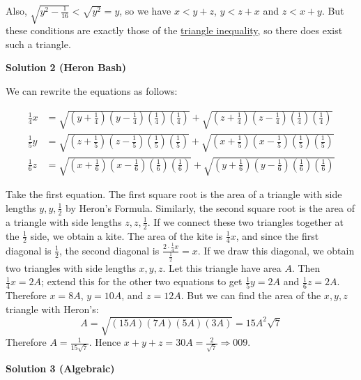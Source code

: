 \begin{enumerate}
 Also, $\sqrt{y^2-\frac{1}{16}} < \sqrt{y^2} = y$, so we have $x < y + z$, $y < z + x$ and $z < x + y$.  But these conditions are exactly those of the \href{https://artofproblemsolving.com/wiki/index.php?title=Triangle\_inequality}{triangle inequality}, so there does exist such a triangle.

 



\textbf{Solution 2 (Heron Bash)}

We can rewrite the equations as follows:

 
 \begin{align*} \frac{1}{4}x &= \sqrt{\left(y+\frac{1}{4}\right) \left(y-\frac{1}{4}\right)\left(\frac{1}{4}\right) \left(\frac{1}{4}\right)}+\sqrt{\left(z+\frac{1}{4}\right) \left(z-\frac{1}{4}\right) \left(\frac{1}{4}\right) \left(\frac{1}{4}\right)} \\ \frac{1}{5} y &= \sqrt{\left(z+\frac{1}{5}\right) \left(z-\frac{1}{5}\right) \left(\frac{1}{5}\right) \left(\frac{1}{5}\right)}+\sqrt{\left(x+\frac{1}{5}\right) \left(x-\frac{1}{5}\right) \left(\frac{1}{5}\right) \left(\frac{1}{5}\right)} \\ \frac{1}{6} z &= \sqrt{\left(x+\frac{1}{6}\right) \left(x-\frac{1}{6}\right) \left(\frac{1}{6}\right) \left(\frac{1}{6}\right)}+\sqrt{\left(y+\frac{1}{6}\right) \left(y-\frac{1}{6}\right) \left(\frac{1}{6}\right) \left(\frac{1}{6}\right)} \end{align*}


 Take the first equation. The first square root is the area of a triangle with side lengths $y,y,\frac{1}{2}$ by Heron’s Formula. Similarly, the second square root is the area of a triangle with side lengths $z,z,\frac{1}{2}$. If we connect these two triangles together at the $\frac{1}{2}$ side, we obtain a kite. The area of the kite is $\frac{1}{4}x$, and since the first diagonal is $\frac{1}{2}$, the second diagonal is $\frac{2\cdot\frac{1}{4}x}{\frac{1}{2}}=x$. If we draw this diagonal, we obtain two triangles with side lengths $x,y,z$. Let this triangle have area $A$. Then $\frac{1}{4}x=2A$; extend this for the other two equations to get $\frac{1}{5}y=2A$ and $\frac{1}{6}z=2A$. Therefore $x=8A$, $y=10A$, and $z=12A$. But we can find the area of the $x,y,z$ triangle with Heron's:
 \[A=\sqrt{(15A)(7A)(5A)(3A)}=15A^2\sqrt{7}\]Therefore $A=\frac{1}{15\sqrt{7}}$. Hence $x+y+z=30A=\frac{2}{\sqrt{7}}\Rightarrow\boxed{009}$.

 



\textbf{Solution 3 (Algebraic)}


\end{enumerate}
